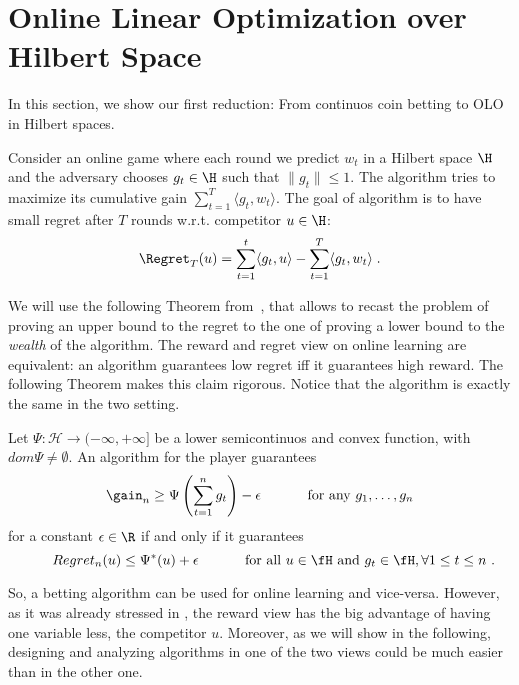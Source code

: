 \section{Online Linear Optimization over Hilbert Space}
\label{section:online-linear-optimization-hilbert-space}

In this section, we show our first reduction: From continuos coin betting to \ac{OLO} in Hilbert spaces.

Consider an online game where each round we predict $w_t$ in a Hilbert space
$\H$ and the adversary chooses $g_t \in \H$ such that $\|g_t\| \le 1$. The
algorithm tries to maximize its cumulative gain $\sum_{t=1}^T \langle g_t, w_t
\rangle$. The goal of algorithm is to have small regret after $T$ rounds w.r.t.
competitor $u \in \H$:
$$
\Regret_T(u) = \sum_{t=1}^t \langle g_t, u \rangle - \sum_{t=1}^T \langle g_t, w_t \rangle \; .
$$

We will use the following Theorem from~\citet{McMahanO14}, that allows to recast the problem of proving an upper bound to the regret to the one of proving a lower bound to the \emph{wealth} of the algorithm.
The reward and regret view on online learning are equivalent: an algorithm guarantees low regret iff it guarantees high reward. The following Theorem makes this claim rigorous. Notice that the algorithm is exactly the same in the two setting.
\begin{theorem}
  \label{thm:rrdual}
  Let $\Psi:\mathcal{H} \rightarrow (-\infty, +\infty]$ be a lower semicontinuos and convex function, with $dom \Psi \neq \emptyset$. An
  algorithm for the player guarantees
  \[
  \gain_n \geq \Psi\left(\sum_{t=1}^n g_t\right) - \epsilon \quad \quad \quad \textnormal{ for any } g_1, \dots, g_n
  \]
  for a constant $\epsilon \in \R$ if and only if it
  guarantees
  \begin{equation}\label{eq:regb}
  \qquad Regret_n(u) \leq \Psi^*(u) + \epsilon \quad \quad \quad \textnormal{ for all } u \in \fH \textnormal{ and } g_t \in \fH, \forall 1\leq t\leq n~.
  \end{equation}
\end{theorem}
So, a betting algorithm can be used for online learning and vice-versa. However, as it was already stressed in \citet{McMahanO14}, the reward view has the big advantage of having one variable less, the competitor $u$.
Moreover, as we will show in the following, designing and analyzing algorithms in one of the two views could be much easier than in the other one.










